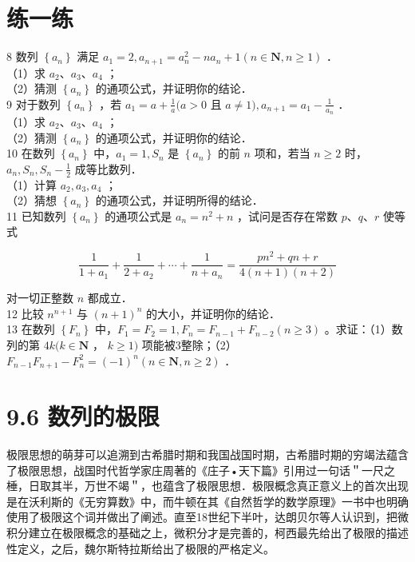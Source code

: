 \documentclass[10pt]{article}
\begin{document}
\section*{练一练}
8 数列 \(\left\{a_{n}\right\}\) 满足 \(a_{1}=2, a_{n+1}=a_{n}^{2}-n a_{n}+1(n \in \mathbf{N}, n \geqslant 1)\) ．\\
（1）求 \(a_{2} 、 a_{3} 、 a_{4}\) ；\\
（2）猜测 \(\left\{a_{n}\right\}\) 的通项公式，并证明你的结论．\\
9 对于数列 \(\left\{a_{n}\right\}\) ，若 \(a_{1}=a+\frac{1}{a}(a>0\) 且 \(a \neq 1), a_{n+1}=a_{1}-\frac{1}{a_{n}}\) ．\\
（1）求 \(a_{2} 、 a_{3} 、 a_{4}\) ；\\
（2）猜测 \(\left\{a_{n}\right\}\) 的通项公式，并证明你的结论．\\
10 在数列 \(\left\{a_{n}\right\}\) 中，\(a_{1}=1, S_{n}\) 是 \(\left\{a_{n}\right\}\) 的前 \(n\) 项和，若当 \(n \geqslant 2\) 时，\(a_{n}, S_{n}, S_{n}-\frac{1}{2}\) 成等比数列．\\
（1）计算 \(a_{2}, a_{3}, a_{4}\) ；\\
（2）猜想 \(\left\{a_{n}\right\}\) 的通项公式，并证明所得的结论．\\
11 已知数列 \(\left\{a_{n}\right\}\) 的通项公式是 \(a_{n}=n^{2}+n\) ，试问是否存在常数 \(p 、 q 、 r\) 使等式

\[
\frac{1}{1+a_{1}}+\frac{1}{2+a_{2}}+\cdots+\frac{1}{n+a_{n}}=\frac{p n^{2}+q n+r}{4(n+1)(n+2)}
\]

对一切正整数 \(n\) 都成立．\\
12 比较 \(n^{n+1}\) 与 \((n+1)^{n}\) 的大小，并证明你的结论．\\
13 在数列 \(\left\{F_{n}\right\}\) 中，\(F_{1}=F_{2}=1, F_{n}=F_{n-1}+F_{n-2}(n \geqslant 3)\) 。求证：（1）数列的第 \(4 k(k \in \mathbf{N}\) ， \(k \geqslant 1)\) 项能被3整除；（2）\(F_{n-1} F_{n+1}-F_{n}^{2}=(-1)^{n}(n \in \mathbf{N}, n \geqslant 2)\) ．

\section*{9.6 数列的极限}
极限思想的萌芽可以追溯到古希腊时期和我国战国时期，古希腊时期的穷竭法蕴含了极限思想，战国时代哲学家庄周著的《庄子•天下篇》引用过一句话＂一尺之棰，日取其半，万世不竭＂，也蕴含了极限思想．极限概念真正意义上的首次出现是在沃利斯的《无穷算数》中，而牛顿在其《自然哲学的数学原理》一书中也明确使用了极限这个词并做出了阐述。直至18世纪下半叶，达朗贝尔等人认识到，把微积分建立在极限概念的基础之上，微积分才是完善的，柯西最先给出了极限的描述性定义，之后，魏尔斯特拉斯给出了极限的严格定义。
\end{document}

